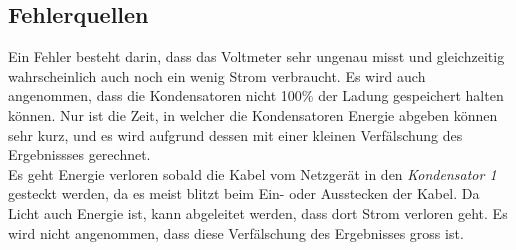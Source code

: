 \documentclass[a4paper,12pt]{article}
\begin{document}







\subsection{Fehlerquellen}

Ein Fehler besteht darin, dass das Voltmeter sehr ungenau misst und gleichzeitig wahrscheinlich auch noch ein wenig Strom verbraucht. Es wird auch angenommen, dass die Kondensatoren nicht 100\% der Ladung gespeichert halten können. Nur ist die Zeit, in welcher die Kondensatoren Energie abgeben können sehr kurz, und es wird aufgrund dessen mit einer kleinen Verfälschung des Ergebnissses gerechnet.\\

Es geht Energie verloren sobald die Kabel vom Netzgerät in den \textit{Kondensator 1} gesteckt werden, da es meist blitzt beim Ein- oder Ausstecken der Kabel. Da Licht auch Energie ist, kann abgeleitet werden, dass dort Strom verloren geht. Es wird nicht angenommen, dass diese Verfälschung des Ergebnisses gross ist.\\
\end{document}
